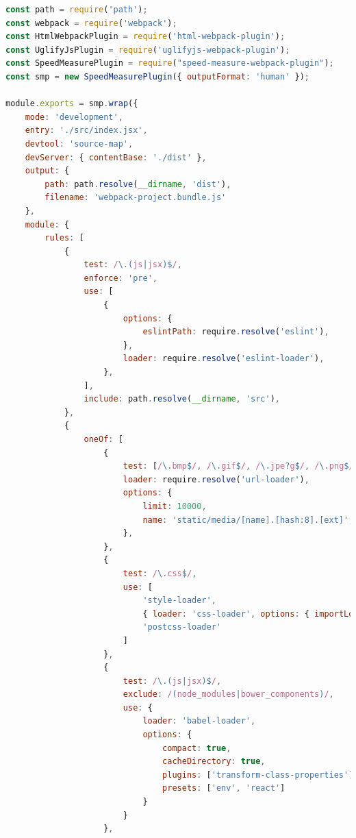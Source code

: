 \documentclass[11pt]{report}
\begin{document}
    \clearpage
    
    \begin{lstlisting}[language=JavaScript,label={figure:baselineConfiguration},caption={Ausgangskonfiguration für Webpack 4 (webpack.config.js)}]
const path = require('path');
const webpack = require('webpack');
const HtmlWebpackPlugin = require('html-webpack-plugin');
const UglifyJsPlugin = require('uglifyjs-webpack-plugin');
const SpeedMeasurePlugin = require("speed-measure-webpack-plugin");
const smp = new SpeedMeasurePlugin({ outputFormat: 'human' });

module.exports = smp.wrap({
    mode: 'development',
    entry: './src/index.jsx',
    devtool: 'source-map',
    devServer: { contentBase: './dist' },
    output: {
        path: path.resolve(__dirname, 'dist'),
        filename: 'webpack-project.bundle.js'
    },
    module: {
        rules: [
            {
                test: /\.(js|jsx)$/,
                enforce: 'pre',
                use: [
                    {
                        options: {
                            eslintPath: require.resolve('eslint'),
                        },
                        loader: require.resolve('eslint-loader'),
                    },
                ],
                include: path.resolve(__dirname, 'src'),
            },
            {
                oneOf: [
                    {
                        test: [/\.bmp$/, /\.gif$/, /\.jpe?g$/, /\.png$/],
                        loader: require.resolve('url-loader'),
                        options: {
                            limit: 10000,
                            name: 'static/media/[name].[hash:8].[ext]',
                        },
                    },
                    {
                        test: /\.css$/,
                        use: [
                            'style-loader',
                            { loader: 'css-loader', options: { importLoaders: 1 } },
                            'postcss-loader'
                        ]
                    },
                    {
                        test: /\.(js|jsx)$/,
                        exclude: /(node_modules|bower_components)/,
                        use: {
                            loader: 'babel-loader',
                            options: {
                                compact: true,
                                cacheDirectory: true,
                                plugins: ['transform-class-properties'],
                                presets: ['env', 'react']
                            }
                        }
                    },

\end{lstlisting}
\end{document}
